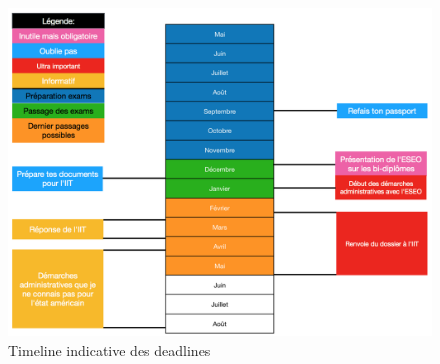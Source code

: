 \begin{figure}[h!]
\centering
\includegraphics[width = 140mm]{figures/Chrono_Chicago}
\caption{Timeline indicative des deadlines}
\end{figure}
